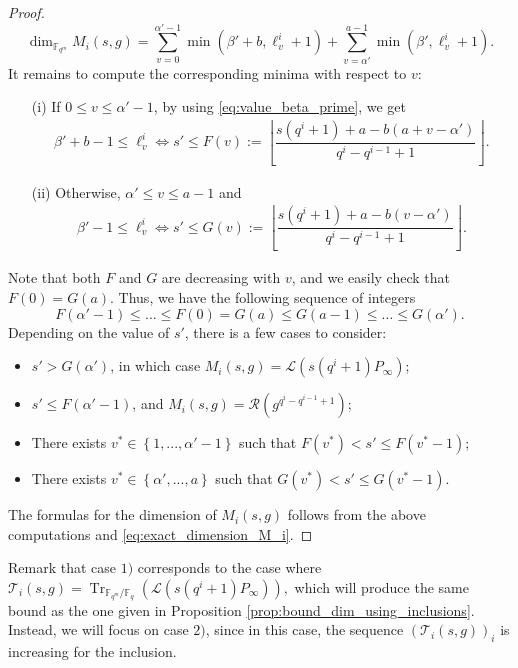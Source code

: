 \documentclass[a4paper]{article}
\theoremstyle{definition}
\theoremstyle{remark}
\newcommand{\calL}{\mathcal{L}}
\newcommand{\calR}{\mathcal{R}}
\newcommand{\calT}{\mathcal{T}}
\newcommand{\fqm}{\mathbb{F}_{q^m}}
\newcommand{\fq}{\mathbb{F}_{q}}
\newcommand{\Tr}[1]{\operatorname{Tr}_{\mathbb{F}_{q^m}/\fq}\left(#1\right)}
\newcommand{\set}[1]{\left\{#1\right\}}
\begin{document}
\begin{proof}
\begin{equation} \label{eq:exact_dimension_M_i}
\dim_{\fqm} M_i(s,g) = \sum\limits_{v=0}^{\alpha'-1} \min(\beta'+b,\ell_v^i+1) + \sum\limits_{v=\alpha'}^{a-1} \min(\beta',\ell_v^i+1).
\end{equation}
It remains to compute the corresponding minima with respect to $v$:
\begin{itemize}
    \item[(i)] If $0 \leq v \leq \alpha'-1$, by using \eqref{eq:value_beta_prime}, we get
    \begin{align*}
        \beta'+b -1 \leq \ell_v^i \iff s' \leq F(v) := \left\lfloor \dfrac{s(q^i+1)+a-b(a+v-\alpha')}{q^i-q^{i-1}+1}\right\rfloor.
    \end{align*}
    \item[(ii)] Otherwise, $\alpha' \leq v \leq a-1$ and
    \begin{align*}
        \beta' -1\leq \ell_v^i \iff s' \leq G(v) := \left\lfloor \dfrac{s(q^i+1)+a-b(v-\alpha')}{q^i-q^{i-1}+1}\right\rfloor .
    \end{align*}
\end{itemize}
Note that both $F$ and $G$ are decreasing with $v$, and we easily check that $F(0) = G(a)$. Thus, we have the following sequence of integers
$$F(\alpha'-1) \leq \dots \leq F(0) = G(a) \leq G(a-1) \leq \dots \leq G(\alpha').$$
Depending on the value of $s'$, there is a few cases  to consider:
\begin{itemize}
    \item $s' >G(\alpha')$, in which case $M_i(s,g) = \calL(s(q^i+1)P_\infty)$;
    \item $s' \leq F(\alpha'-1)$, and $M_i(s,g) = \calR(g^{q^i-q^{i-1}+1})$;
    \item There exists $v^* \in \set{1,...,\alpha'-1}$ such that $F(v^*) < s' \leq F(v^*-1)$;
    \item There exists $v^* \in \set{\alpha',...,a}$ such that $G(v^*) < s' \leq G(v^*-1)$.
\end{itemize}
The formulas for the dimension of $M_i(s,g)$ follows from the above computations and \eqref{eq:exact_dimension_M_i}.
\end{proof}

Remark that case $1)$ corresponds to the case where $\calT_i(s,g) = \Tr{\calL(s(q^i+1)P_\infty)}, $ which will produce the same bound as the one given in Proposition \ref{prop:bound_dim_using_inclusions}.
Instead, we will focus on case $2)$, since in this case, the sequence $(\calT_i(s,g))_i$ is increasing for the inclusion. 
\end{document}
